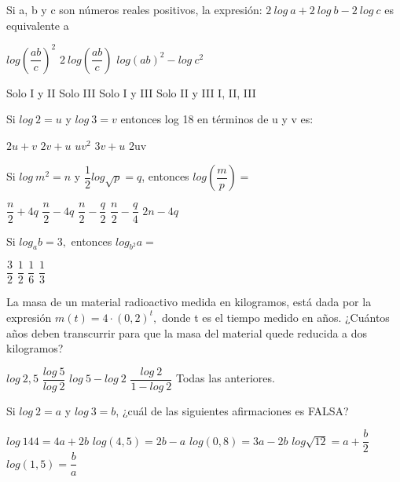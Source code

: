 \documentclass[pagina vacia]{srs}
\begin{document}
\begin{preguntas}
\pregunta Si a, b y c son números reales positivos, la expresión: $2~log~a+2~log~b-2~log~c$ es equivalente a
\begin{verticali}
\alternativa $log\left(\dfrac{ab}{c}\right)^{2}$
\alternativa $2~log\left(\dfrac{ab}{c}\right)$
\alternativa $log\left(ab\right)^{2}-log~c^{2}$
\end{verticali}
\begin{vertical}
\alternativa Solo I y II
\alternativa Solo III
\alternativa Solo I y III
\alternativa Solo II y III
\alternativa I, II, III
\end{vertical}

\pregunta Si $log~2=u$ y $log~3=v$ entonces log 18 en términos de u y v es:
\begin{vertical}
\alternativa $2u+v$
\alternativa $2v+u$
\alternativa $uv^{2}$
\alternativa $3v+u$
\alternativa 2uv
\end{vertical}

\pregunta Si $log~m^{2}=n$ y $\dfrac{1}{2}log\sqrt{p}=q$, entonces $log\left(\dfrac{m}{p}\right)=$
\begin{vertical}
\alternativa $\dfrac{n}{2}+4q$
\alternativa $\dfrac{n}{2}-4q$
\alternativa $\dfrac{n}{2}-\dfrac{q}{2}$
\alternativa $\dfrac{n}{2}-\dfrac{q}{4}$
\alternativa $2n-4q$
\end{vertical}

\pregunta Si $log_{a}b=3,$ entonces $log_{b^{2}}a=$
\begin{vertical}
\alternativa $\dfrac{3}{2}$
\alternativa $\dfrac{1}{2}$
\alternativa $\dfrac{1}{6}$
\alternativa $\dfrac{1}{3}$
\end{vertical}

\pregunta La masa de un material radioactivo medida en kilogramos, está dada por la expresión $m(t)=4\cdot\left(0,2\right)^{t},$ donde t es el tiempo medido en años. ¿Cuántos años deben transcurrir para que la masa del material quede reducida a dos kilogramos?
\begin{vertical}
\alternativa $log~2,5$
\alternativa $\dfrac{log~5}{log~2}$
\alternativa $log~5-log~2$
\alternativa $\dfrac{log~2}{1-log~2}$
\alternativa Todas las anteriores.
\end{vertical}

\pregunta Si $log~2=a$ y $log~3=b$, ¿cuál de las siguientes afirmaciones es FALSA?
\begin{vertical}
\alternativa $log~144=4a+2b$
\alternativa $log\left(4,5\right)=2b-a$
\alternativa $log\left(0,8\right)=3a-2b$
\alternativa $log\sqrt{12}=a+\dfrac{b}{2}$
\alternativa $log\left(1,5\right)=\dfrac{b}{a}$
\end{vertical}


\end{preguntas}
\end{document}
